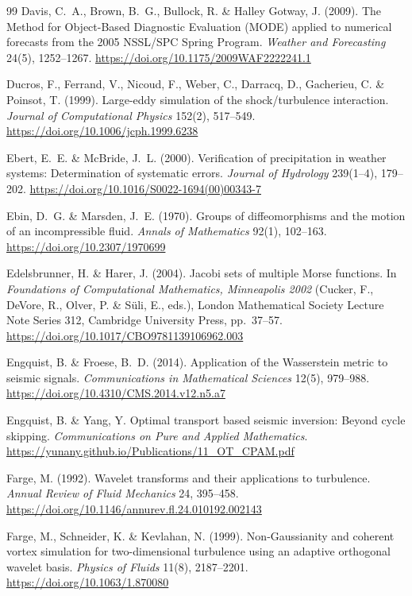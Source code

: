 \documentclass[11pt]{article}
\begin{document}
\begin{thebibliography}{99}
 Davis, C.\ A., Brown, B.\ G., Bullock, R. \& Halley Gotway, J. (2009).
The Method for Object-Based Diagnostic Evaluation (MODE) applied to numerical forecasts from
the 2005 NSSL/SPC Spring Program. \emph{Weather and Forecasting} 24(5), 1252--1267.
\url{https://doi.org/10.1175/2009WAF2222241.1}

 Ducros, F., Ferrand, V., Nicoud, F., Weber, C., Darracq, D., Gacherieu,
C. \& Poinsot, T. (1999). Large-eddy simulation of the shock/turbulence interaction.
\emph{Journal of Computational Physics} 152(2), 517--549.
\url{https://doi.org/10.1006/jcph.1999.6238}

 Ebert, E.\ E. \& McBride, J.\ L. (2000). Verification of
precipitation in weather systems: Determination of systematic errors.
\emph{Journal of Hydrology} 239(1--4), 179--202.
\url{https://doi.org/10.1016/S0022-1694(00)00343-7}

 Ebin, D.\ G. \& Marsden, J.\ E. (1970). Groups of diffeomorphisms
and the motion of an incompressible fluid. \emph{Annals of Mathematics} 92(1), 102--163.
\url{https://doi.org/10.2307/1970699}

 Edelsbrunner, H. \& Harer, J. (2004). Jacobi sets of multiple
Morse functions. In \emph{Foundations of Computational Mathematics, Minneapolis 2002}
(Cucker, F., DeVore, R., Olver, P. \& S\"uli, E., eds.), London Mathematical Society Lecture
Note Series 312, Cambridge University Press, pp.\ 37--57.
\url{https://doi.org/10.1017/CBO9781139106962.003}

 Engquist, B. \& Froese, B.\ D. (2014). Application of the Wasserstein
metric to seismic signals. \emph{Communications in Mathematical Sciences} 12(5), 979--988.
\url{https://doi.org/10.4310/CMS.2014.v12.n5.a7}

 Engquist, B. \& Yang, Y. Optimal transport based seismic inversion:
Beyond cycle skipping. \emph{Communications on Pure and Applied Mathematics}.
\url{https://yunany.github.io/Publications/11_OT_CPAM.pdf}

 Farge, M. (1992). Wavelet transforms and their applications to turbulence.
\emph{Annual Review of Fluid Mechanics} 24, 395--458.
\url{https://doi.org/10.1146/annurev.fl.24.010192.002143}

 Farge, M., Schneider, K. \& Kevlahan, N. (1999). Non-Gaussianity
and coherent vortex simulation for two-dimensional turbulence using an adaptive orthogonal
wavelet basis. \emph{Physics of Fluids} 11(8), 2187--2201.
\url{https://doi.org/10.1063/1.870080}


\end{thebibliography}
\end{document}
